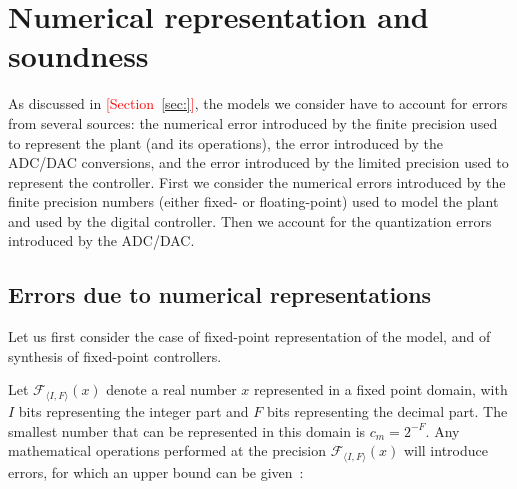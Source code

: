 \documentclass[twocolumn]{autart}    %
\renewcommand{\note}[1]{\textcolor{red}{[#1]}}
\begin{document}
\section{Numerical representation and soundness} 
\label{sec:numeric_rep}

As discussed in \note{Section~\ref{sec:}}, 
the models we consider have to account for errors from several sources: 
the numerical error introduced by the finite precision used to represent the plant (and its operations),  
the error introduced by the ADC/DAC conversions, 
and the error introduced by the limited precision used to represent the controller. 
First we consider the numerical errors introduced by the finite precision numbers (either fixed- or floating-point) used to model the plant and used by the digital controller. 
Then we account for the quantization errors introduced by the ADC/DAC.

\subsection{Errors due to numerical representations} 

Let us first consider the case of fixed-point representation of the model, 
and of synthesis of fixed-point controllers. 

Let $\mathcal{F}_{\langle I,F \rangle}(x)$ denote a real number $x$
represented in a fixed point domain, with $I$ bits representing the integer
part and $F$ bits representing the decimal part.  The smallest number that
can be represented in this domain is $c_m=2^{-F}$.  Any mathematical
operations performed at the precision $\mathcal{F}_{\langle I,F \rangle}(x)$
will introduce errors, for which an upper bound can be
given~\cite{DBLP:conf/arith/BrainTRW15}:
\end{document}
